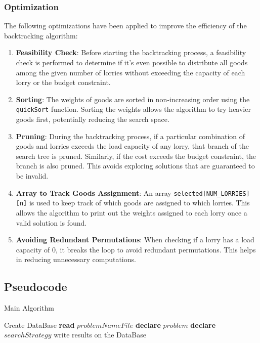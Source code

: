 \documentclass{article}
\begin{document}
\subsubsection{Optimization}
The following optimizations have been applied to improve the efficiency of the backtracking algorithm:
\begin{enumerate}
	\item \textbf{Feasibility Check}: Before starting the backtracking process, a feasibility check is performed to determine if it's even possible to distribute all goods among the given number of lorries without exceeding the capacity of each lorry or the budget constraint.

	\item \textbf{Sorting}: The weights of goods are sorted in non-increasing order using the \texttt{quickSort} function. Sorting the weights allows the algorithm to try heavier goods first, potentially reducing the search space.

	\item \textbf{Pruning}: During the backtracking process, if a particular combination of goods and lorries exceeds the load capacity of any lorry, that branch of the search tree is pruned. Similarly, if the cost exceeds the budget constraint, the branch is also pruned. This avoids exploring solutions that are guaranteed to be invalid.

	\item \textbf{Array to Track Goods Assignment}: An array \texttt{selected[NUM\_LORRIES][n]} is used to keep track of which goods are assigned to which lorries. This allows the algorithm to print out the weights assigned to each lorry once a valid solution is found.

	\item \textbf{Avoiding Redundant Permutations}: When checking if a lorry has a load capacity of 0, it breaks the loop to avoid redundant permutations. This helps in reducing unnecessary computations.
\end{enumerate}

\subsection{Pseudocode}
\begin{algorithm}
	\caption{Main Algorithm}
	\label{algo:main}
	\begin{algorithmic}[1]
		\State Create DataBase
				\State \textbf{read} $problemNameFile$
				\State \textbf{declare} $problem$
				\State \textbf{declare} $searchStrategy$
				\State {}
				\State write results on the DataBase
			\EndFor
		\EndFor
		\EndFunction
	\end{algorithmic}
\end{algorithm}
\end{document}
